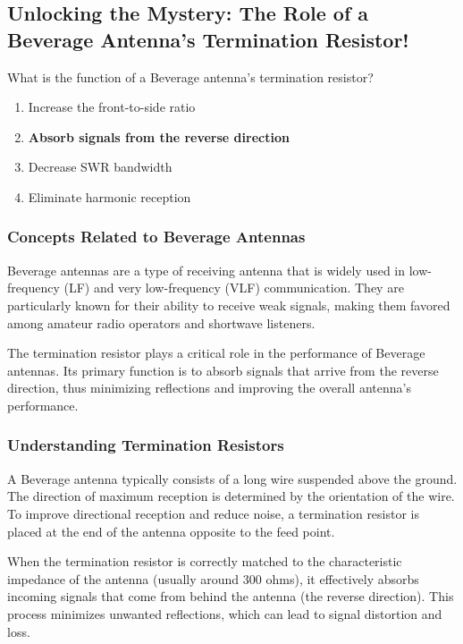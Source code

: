 \subsection{Unlocking the Mystery: The Role of a Beverage Antenna's Termination Resistor!}

\begin{tcolorbox}[colback=gray!10, colframe=black, title=E9H07] What is the function of a Beverage antenna’s termination resistor?
\begin{enumerate}[label=\Alph*.]
    \item Increase the front-to-side ratio
    \item \textbf{Absorb signals from the reverse direction}
    \item Decrease SWR bandwidth
    \item Eliminate harmonic reception
\end{enumerate} \end{tcolorbox}

\subsubsection{Concepts Related to Beverage Antennas}
Beverage antennas are a type of receiving antenna that is widely used in low-frequency (LF) and very low-frequency (VLF) communication. They are particularly known for their ability to receive weak signals, making them favored among amateur radio operators and shortwave listeners. 

The termination resistor plays a critical role in the performance of Beverage antennas. Its primary function is to absorb signals that arrive from the reverse direction, thus minimizing reflections and improving the overall antenna's performance.

\subsubsection{Understanding Termination Resistors}
A Beverage antenna typically consists of a long wire suspended above the ground. The direction of maximum reception is determined by the orientation of the wire. To improve directional reception and reduce noise, a termination resistor is placed at the end of the antenna opposite to the feed point.

When the termination resistor is correctly matched to the characteristic impedance of the antenna (usually around 300 ohms), it effectively absorbs incoming signals that come from behind the antenna (the reverse direction). This process minimizes unwanted reflections, which can lead to signal distortion and loss.

